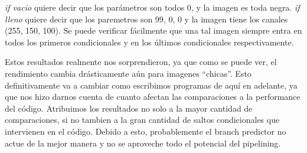 \textit{if vacio} quiere decir que los parámetros son todos 0, y la imagen es toda negra. \textit{if lleno} quiere decir que los paremetros son 99, 0, 0 y la imagen tiene los canales (255, 150, 100).  Se puede verificar fácilmente que una tal imagen siempre entra en todos los primeros condicionales y en los últimos condicionales respectivamente.

Estos resultados realmente nos sorprendieron, ya que como se puede ver, el rendimiento cambia drásticamente aún para imagenes ``chicas''. Esto definitivamente va a cambiar como escribimos programas de aquí en adelante, ya que nos hizo darnos cuenta de cuanto afectan las comparaciones a la performance del código.
Atribuimos los resultados no solo a la mayor cantidad de comparaciones, si no tambien a la gran cantidad de saltos condicionales que intervienen en el código. Debido a esto, probablemente el branch predictor no actue de la mejor manera y no se aproveche todo el potencial del pipelining.








